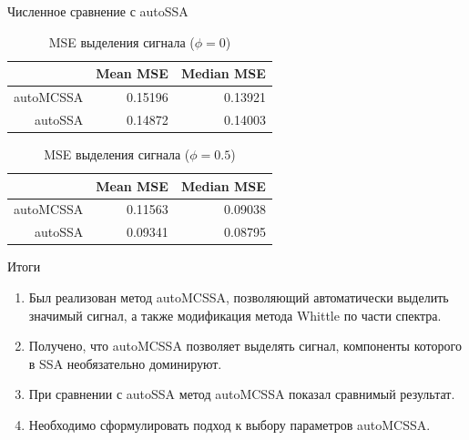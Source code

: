 \documentclass[notheorems, handout]{beamer}
\begin{document}
\begin{frame}{Численное сравнение с autoSSA}
	\begin{table}[h]
		\centering
		\caption{MSE выделения сигнала ($\phi=0$)}
		\begin{tabular}{|r|r|r|}
			\hline
			& Mean MSE & Median MSE \\ 
			\hline
			autoMCSSA & 0.15196 & 0.13921 \\ 
			\hline
			autoSSA & 0.14872 & 0.14003 \\ 
			\hline
		\end{tabular}
	\end{table}
	\begin{table}[h]
		\centering
		\caption{MSE выделения сигнала ($\phi=0.5$)}
		\begin{tabular}{|r|r|r|}
			\hline
			& Mean MSE & Median MSE \\ 
			\hline
			autoMCSSA & 0.11563 & 0.09038 \\ 
			\hline
			autoSSA & 0.09341 & 0.08795 \\ 
			\hline
		\end{tabular}
	\end{table}
\end{frame}

\begin{frame}{Итоги}
	\begin{enumerate}
		\item Был реализован метод autoMCSSA, позволяющий автоматически выделить значимый сигнал, а также модификация метода Whittle по части спектра.\medskip
		\item Получено, что autoMCSSA позволяет выделять сигнал, компоненты которого в SSA необязательно доминируют.\medskip
		\item При сравнении с autoSSA метод autoMCSSA показал сравнимый результат.\medskip
		\item Необходимо сформулировать подход к выбору параметров autoMCSSA.
	\end{enumerate}
\end{frame}
\end{document}
